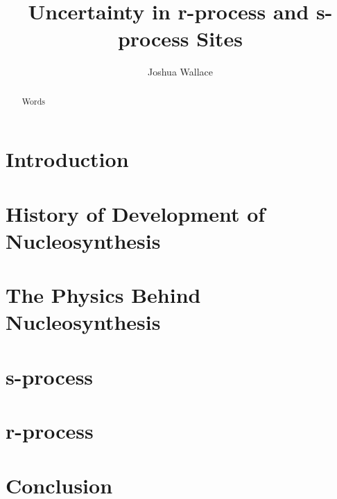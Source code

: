\documentclass{emulateapj}
\begin{document}
\title{Uncertainty in r-process and s-process Sites}

\author{Joshua Wallace}

\begin{abstract}
Words
\end{abstract}



\section{Introduction}


\section{History of Development of Nucleosynthesis}


\section{The Physics Behind Nucleosynthesis}


\section{s-process}



\section{r-process}



\section{Conclusion}




\end{document}
